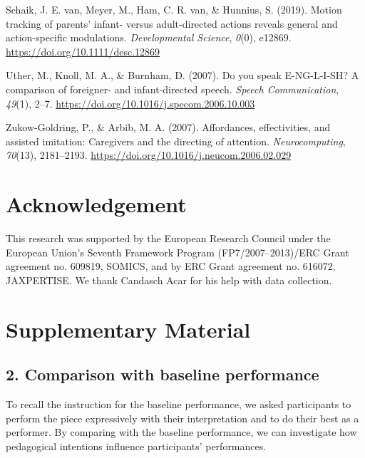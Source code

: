 \documentclass[
  man,floatsintext]{apa6}
\newlength{\cslhangindent}
\newlength{\cslentryspacingunit} %
\newenvironment{CSLReferences}[2] %
 {%
  \setlength{\parindent}{0pt}
  \ifodd #1
  \let\oldpar\par
  \def\par{\hangindent=\cslhangindent\oldpar}
  \fi
  \setlength{\parskip}{#2\cslentryspacingunit}
 }%
 {}
\begin{document}
\begin{CSLReferences}{1}{0}
\leavevmode{}%
Schaik, J. E. van, Meyer, M., Ham, C. R. van, \& Hunnius, S. (2019). Motion tracking of parents' infant- versus adult-directed actions reveals general and action-specific modulations. \emph{Developmental Science}, \emph{0}(0), e12869. \url{https://doi.org/10.1111/desc.12869}

\leavevmode{}%
Uther, M., Knoll, M. A., \& Burnham, D. (2007). Do you speak {E-NG-L-I-SH}? {A} comparison of foreigner- and infant-directed speech. \emph{Speech Communication}, \emph{49}(1), 2--7. \url{https://doi.org/10.1016/j.specom.2006.10.003}

\leavevmode{}%
Zukow-Goldring, P., \& Arbib, M. A. (2007). Affordances, effectivities, and assisted imitation: {Caregivers} and the directing of attention. \emph{Neurocomputing}, \emph{70}(13), 2181--2193. \url{https://doi.org/10.1016/j.neucom.2006.02.029}

\end{CSLReferences}

\endgroup

\hypertarget{acknowledgement}{%
\section{Acknowledgement}\label{acknowledgement}}

This research was supported by the European Research Council under the European Union's Seventh Framework Program (FP7/2007--2013)/ERC Grant agreement no. 609819, SOMICS, and by ERC Grant agreement no. 616072, JAXPERTISE. We thank Candasch Acar for his help with data collection.

\clearpage

\hypertarget{supplementary-material}{%
\section{Supplementary Material}\label{supplementary-material}}

\hypertarget{comparison-with-baseline-performance}{%
\subsection{2. Comparison with baseline performance}\label{comparison-with-baseline-performance}}

To recall the instruction for the baseline performance, we asked participants to perform the piece expressively with their interpretation and to do their best as a performer. By comparing with the baseline performance, we can investigate how pedagogical intentions influence participants' performances.
\end{document}
